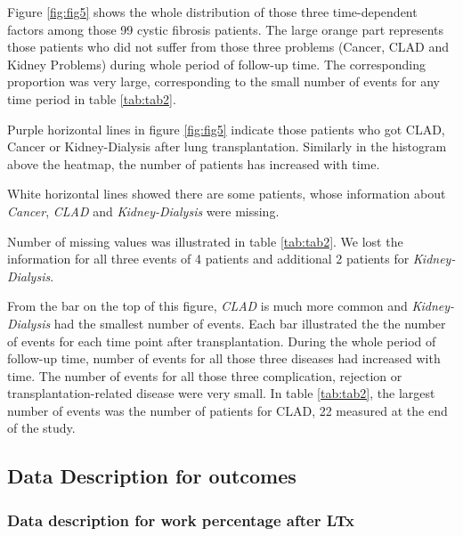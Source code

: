 \documentclass[11pt, a4paper]{article}\usepackage[]{graphicx}\usepackage[]{color}
\begin{document}
Figure \ref{fig:fig5} shows the whole distribution of those three time-dependent factors among those 99 cystic fibrosis patients. The large orange part represents those patients who did not suffer from those three problems (Cancer, CLAD and Kidney Problems) during whole period of follow-up time. The corresponding proportion was very large, corresponding to the small number of events for any time period in table \ref{tab:tab2}.

Purple horizontal lines in figure \ref{fig:fig5} indicate those patients who got CLAD, Cancer or Kidney-Dialysis after lung transplantation. Similarly in the histogram above the heatmap, the number of patients has increased with time.

White horizontal lines showed there are some patients, whose information about \textit{Cancer}, \textit{CLAD} and \textit{Kidney-Dialysis} were missing. 

Number of missing values was illustrated in table \ref{tab:tab2}. We lost the information for all three events of 4 patients and additional 2 patients for \textit{Kidney-Dialysis}. 

From the bar on the top of this figure, \textit{CLAD} is much more common and \textit{Kidney-Dialysis} had the smallest number of events. Each bar illustrated the the number of events for each time point after transplantation. During the whole period of follow-up time, number of events for all those three diseases had increased with time. The number of events for all those three complication, rejection or transplantation-related disease were very small. In table \ref{tab:tab2}, the largest number of events was the number of patients for CLAD, 22 measured at the end of the study. 




\clearpage
\subsection*{Data Description for outcomes} \label{subsec:outcomes}
\subsubsection*{Data description for work percentage after LTx}\label{subsubsec:perc}
\end{document}
